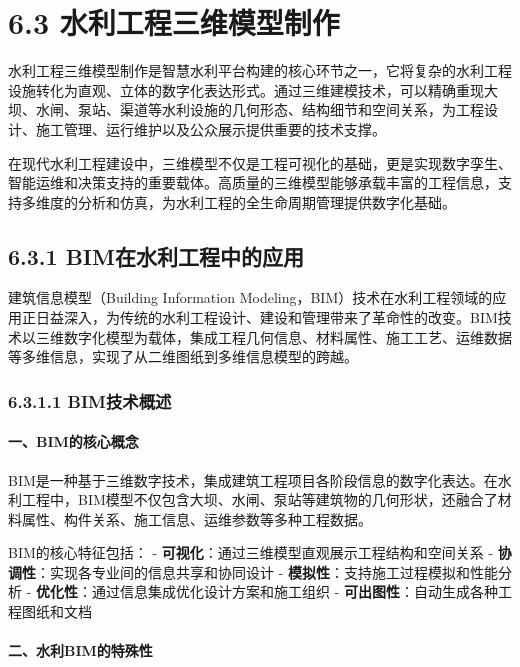 \section{6.3
水利工程三维模型制作}\label{ux6c34ux5229ux5de5ux7a0bux4e09ux7ef4ux6a21ux578bux5236ux4f5c}

水利工程三维模型制作是智慧水利平台构建的核心环节之一，它将复杂的水利工程设施转化为直观、立体的数字化表达形式。通过三维建模技术，可以精确重现大坝、水闸、泵站、渠道等水利设施的几何形态、结构细节和空间关系，为工程设计、施工管理、运行维护以及公众展示提供重要的技术支撑。

在现代水利工程建设中，三维模型不仅是工程可视化的基础，更是实现数字孪生、智能运维和决策支持的重要载体。高质量的三维模型能够承载丰富的工程信息，支持多维度的分析和仿真，为水利工程的全生命周期管理提供数字化基础。

\subsection{6.3.1
BIM在水利工程中的应用}\label{bimux5728ux6c34ux5229ux5de5ux7a0bux4e2dux7684ux5e94ux7528}

建筑信息模型（Building Information
Modeling，BIM）技术在水利工程领域的应用正日益深入，为传统的水利工程设计、建设和管理带来了革命性的改变。BIM技术以三维数字化模型为载体，集成工程几何信息、材料属性、施工工艺、运维数据等多维信息，实现了从二维图纸到多维信息模型的跨越。

\subsubsection{6.3.1.1 BIM技术概述}\label{bimux6280ux672fux6982ux8ff0}

\paragraph{一、BIM的核心概念}\label{ux4e00bimux7684ux6838ux5fc3ux6982ux5ff5}

BIM是一种基于三维数字技术，集成建筑工程项目各阶段信息的数字化表达。在水利工程中，BIM模型不仅包含大坝、水闸、泵站等建筑物的几何形状，还融合了材料属性、构件关系、施工信息、运维参数等多种工程数据。

BIM的核心特征包括： -
\textbf{可视化}：通过三维模型直观展示工程结构和空间关系 -
\textbf{协调性}：实现各专业间的信息共享和协同设计 -
\textbf{模拟性}：支持施工过程模拟和性能分析 -
\textbf{优化性}：通过信息集成优化设计方案和施工组织 -
\textbf{可出图性}：自动生成各种工程图纸和文档

\paragraph{二、水利BIM的特殊性}\label{ux4e8cux6c34ux5229bimux7684ux7279ux6b8aux6027}


